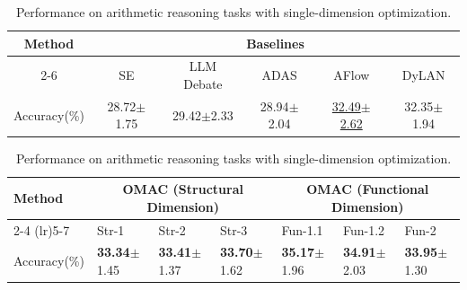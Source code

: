 


\begin{table}[t]\footnotesize
  \centering
  \begin{threeparttable}
    \captionsetup{width=\textwidth}
    \caption{Performance on arithmetic reasoning tasks with single-dimension optimization.}
    \label{tab:single_3}

    \begin{minipage}{0.9\textwidth}
      \centering
      \begin{tabular}{cccccc}
        \toprule
        \multirow{2}{*}{Method}
          & \multicolumn{5}{c}{Baselines} \\
        \cmidrule(lr){2-6}
        & SE\scriptsize
        & LLM Debate \scriptsize
        & ADAS \scriptsize
        & AFlow \scriptsize
        & DyLAN\scriptsize \\
        \midrule
        Accuracy(\%)
          & 28.72\tiny{$\pm$1.75}
          & 29.42\tiny{$\pm$2.33}
          & 28.94\tiny{$\pm$2.04}
          & \underline{32.49\tiny{$\pm$2.62}}
          & {32.35\tiny{$\pm$1.94}} \\
        \bottomrule
      \end{tabular}
    \end{minipage}

    \vspace{0.2cm}

    \begin{minipage}{0.9\textwidth}
    \begin{tabular}{%
        p{1.5cm}
        p{1.4cm}<{\centering}
        p{1.4cm}<{\centering}
        p{1.4cm}<{\centering}
        p{1.4cm}<{\centering}
        p{1.4cm}<{\centering}
        p{1.4cm}<{\centering}}
      \toprule
      \multirow{2}{*}{Method}
        & \multicolumn{3}{c}{OMAC (Structural Dimension)} & \multicolumn{3}{c}{OMAC (Functional Dimension)} \\
      \cmidrule(lr){2-4}  \cmidrule(lr){5-7}
      & Str-1\scriptsize & Str-2\scriptsize & Str-3\scriptsize
      & Fun-1.1\scriptsize & Fun-1.2\scriptsize & Fun-2 \\
      \midrule
      Accuracy(\%)
        & \textbf{33.34}\tiny{$\pm$1.45} & \textbf{33.41}\tiny{$\pm$1.37}
        & \textbf{33.70}\tiny{$\pm$1.62} & \textbf{35.17}\tiny{$\pm$1.96}
        & \textbf{34.91}\tiny{$\pm$2.03} & \textbf{33.95}\tiny{$\pm$1.30} \\
      \bottomrule
    \end{tabular}
    \end{minipage}

  \end{threeparttable}
\end{table}




